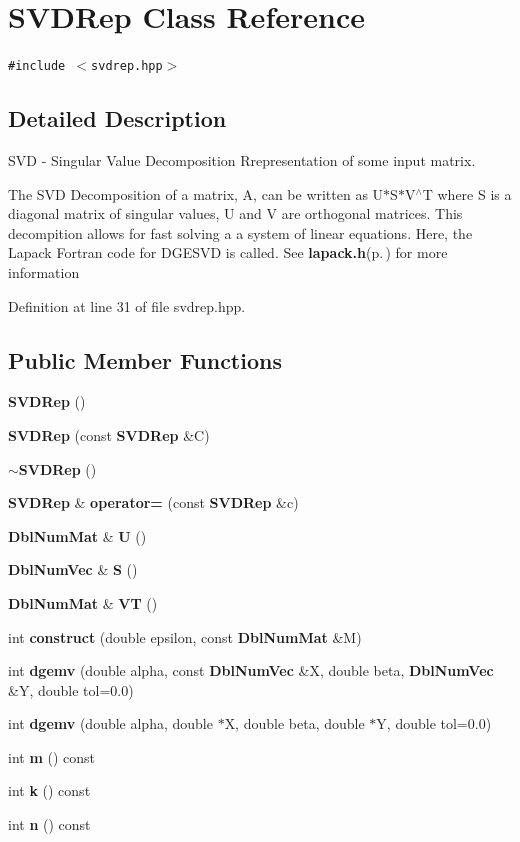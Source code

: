 \section{SVDRep Class Reference}
\label{classSVDRep}
{\tt \#include $<$svdrep.hpp$>$}



\subsection{Detailed Description}
SVD - Singular Value Decomposition Rrepresentation of some input matrix. 

The SVD Decomposition of a matrix, A, can be written as U$\ast$S$\ast$V$^\wedge$T where S is a diagonal matrix of singular values, U and V are orthogonal matrices. This decompition allows for fast solving a a system of linear equations. Here, the Lapack Fortran code for DGESVD is called. See {\bf lapack.h}{\rm (p.\,\pageref{lapack_8h})} for more information 



Definition at line 31 of file svdrep.hpp.\subsection*{Public Member Functions}
\begin{CompactItemize}
\item 
{\bf SVDRep} ()
\item 
{\bf SVDRep} (const {\bf SVDRep} \&C)
\item 
{\bf $\sim$SVDRep} ()
\item 
{\bf SVDRep} \& {\bf operator=} (const {\bf SVDRep} \&c)
\item 
{\bf Dbl\-Num\-Mat} \& {\bf U} ()
\item 
{\bf Dbl\-Num\-Vec} \& {\bf S} ()
\item 
{\bf Dbl\-Num\-Mat} \& {\bf VT} ()
\item 
int {\bf construct} (double epsilon, const {\bf Dbl\-Num\-Mat} \&M)
\item 
int {\bf dgemv} (double alpha, const {\bf Dbl\-Num\-Vec} \&X, double beta, {\bf Dbl\-Num\-Vec} \&Y, double tol=0.0)
\item 
int {\bf dgemv} (double alpha, double $\ast$X, double beta, double $\ast$Y, double tol=0.0)
\item 
int {\bf m} () const 
\item 
int {\bf k} () const 
\item 
int {\bf n} () const 
\end{CompactItemize}
